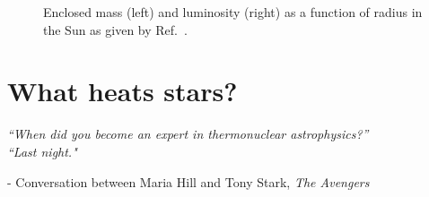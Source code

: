 \documentclass[12pt]{article}
\begin{document}
\begin{figure}[H]
    \centering
    \caption{Enclosed mass (left) and luminosity (right) as a function of radius in the Sun as given by Ref.~\cite{Bahcall_2005}.\vspace{1cm}}
    \label{fig:SSM_mass_shine}
\end{figure}

\section{What heats stars?} \label{sec:heat}
\begin{flushleft} \singlespacing \vspace{-0.25cm}
    \textit{``When did you become an expert in thermonuclear astrophysics?''}\\
    \textit{``Last night."} \\
\end{flushleft} 
\begin{flushright} \vspace{-0.5cm}
    - Conversation between Maria Hill and Tony Stark, \textit{The Avengers}
\end{flushright}
\doublespacing
\end{document}
